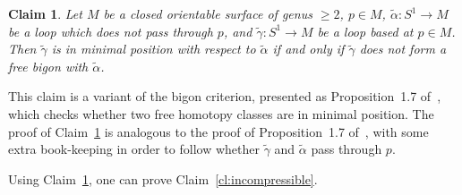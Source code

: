 \documentclass[11pt]{article}
\newtheorem{claim}[theorem]{Claim}
\begin{document}
        \begin{claim}
        \label{cl:bigon}
            Let $M$ be a closed orientable surface of genus $\geq 2$, $p \in M$, $\tilde{\alpha}: S^1 \to M$ be a loop which does not pass through $p$, and $\tilde{\gamma}: S^1 \to M$ be a loop based at $p \in M$. Then $\tilde{\gamma}$ is in minimal position with respect to $\tilde{\alpha}$ if and only if $\tilde{\gamma}$ does not form a free bigon with $\tilde{\alpha}$.
        \end{claim}
        
        This claim is a variant of the bigon criterion, presented as Proposition~1.7 of~\cite{FM}, which checks whether two free homotopy classes are in minimal position. The proof of Claim~\ref{cl:bigon} is analogous to the proof of Proposition~1.7 of~\cite{FM}, with some extra book-keeping in order to follow whether $\tilde{\gamma}$ and $\tilde{\alpha}$ pass through $p$.
        
        Using Claim~\ref{cl:bigon}, one can prove Claim~\ref{cl:incompressible}.
        
\end{document}
